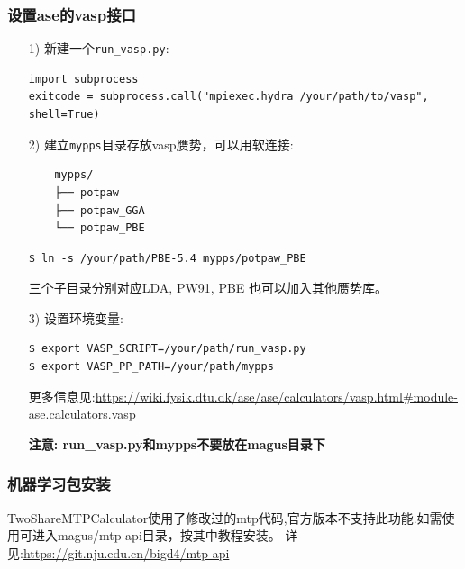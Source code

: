 \documentclass[12pt]{article}
\newcommand{\file}[1]{\texttt{#1}}
\begin{document}
\subsubsection{设置ase的vasp接口}
\begin{itemize}
    \item [1)] 
    新建一个\file{run\_vasp.py}:
    \begin{tcolorbox}
    \begin{verbatim}
import subprocess
exitcode = subprocess.call("mpiexec.hydra /your/path/to/vasp", shell=True)
    \end{verbatim}
    \end{tcolorbox}
    \item [2)] 
    建立\file{mypps}目录存放vasp赝势，可以用软连接:
    \begin{verbatim}
    mypps/
    ├── potpaw
    ├── potpaw_GGA
    └── potpaw_PBE
    \end{verbatim}
    \begin{tcolorbox}
        \begin{verbatim}
$ ln -s /your/path/PBE-5.4 mypps/potpaw_PBE
        \end{verbatim}
    \end{tcolorbox}
    三个子目录分别对应LDA, PW91, PBE
    也可以加入其他赝势库。
    \item [3)] 
    设置环境变量:
    \begin{tcolorbox}
        \begin{verbatim}
$ export VASP_SCRIPT=/your/path/run_vasp.py
$ export VASP_PP_PATH=/your/path/mypps
        \end{verbatim}
    \end{tcolorbox}
    更多信息见:\textcolor{blue}{\url{https://wiki.fysik.dtu.dk/ase/ase/calculators/vasp.html\#module-ase.calculators.vasp}}\par
    \textbf{注意: run\_vasp.py和mypps不要放在magus目录下}
\end{itemize}
\subsubsection{机器学习包安装}
TwoShareMTPCalculator使用了修改过的mtp代码,官方版本不支持此功能.如需使用可进入magus/mtp-api目录，按其中教程安装。
详见:\textcolor{blue}{\url{https://git.nju.edu.cn/bigd4/mtp-api}}
\end{document}
